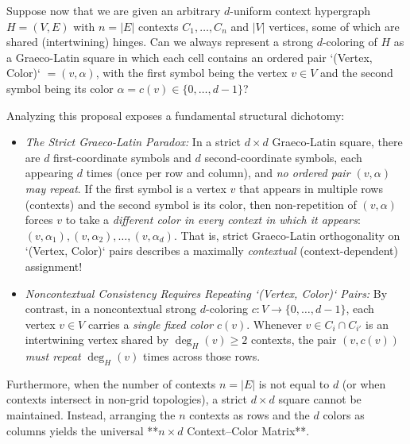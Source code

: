 \documentclass[aps,pra,reprint,superscriptaddress,longbibliography,nofootinbib,floatfix,10pt]{revtex4-2}
\theoremstyle{definition}\newtheorem{definition}[theorem]{Definition}
\theoremstyle{remark}\newtheorem{remark}[theorem]{Remark}
\begin{document}
Suppose now that we are given an arbitrary $d$-uniform context hypergraph $H=(V,E)$ with $n=|E|$ contexts $C_1,\ldots,C_n$ and $|V|$ vertices, some of which are shared (intertwining) hinges. Can we always represent a strong $d$-coloring of $H$ as a Graeco-Latin square in which each cell contains an ordered pair `(Vertex, Color)` $=(v,\alpha)$, with the first symbol being the vertex $v\in V$ and the second symbol being its color $\alpha=c(v)\in\{0,\ldots,d-1\}$?

Analyzing this proposal exposes a fundamental structural dichotomy:
\begin{itemize}
\item \emph{The Strict Graeco-Latin Paradox:} In a strict $d\times d$ Graeco-Latin square, there are $d$ first-coordinate symbols and $d$ second-coordinate symbols, each appearing $d$ times (once per row and column), and \emph{no ordered pair $(v,\alpha)$ may repeat}. If the first symbol is a vertex $v$ that appears in multiple rows (contexts) and the second symbol is its color, then non-repetition of $(v,\alpha)$ forces $v$ to take a \emph{different color in every context in which it appears}: $(v,\alpha_1),(v,\alpha_2),\ldots,(v,\alpha_d)$. That is, strict Graeco-Latin orthogonality on `(Vertex, Color)` pairs describes a maximally \emph{contextual} (context-dependent) assignment!
\item \emph{Noncontextual Consistency Requires Repeating `(Vertex, Color)` Pairs:} By contrast, in a noncontextual strong $d$-coloring $c:V\to\{0,\ldots,d-1\}$, each vertex $v\in V$ carries a \emph{single fixed color} $c(v)$. Whenever $v\in C_i\cap C_{i'}$ is an intertwining vertex shared by $\deg_H(v)\ge 2$ contexts, the pair $(v,c(v))$ \emph{must repeat} $\deg_H(v)$ times across those rows.
\end{itemize}

Furthermore, when the number of contexts $n=|E|$ is not equal to $d$ (or when contexts intersect in non-grid topologies), a strict $d\times d$ square cannot be maintained. Instead, arranging the $n$ contexts as rows and the $d$ colors as columns yields the universal **$n\times d$ Context--Color Matrix**.
\end{document}
